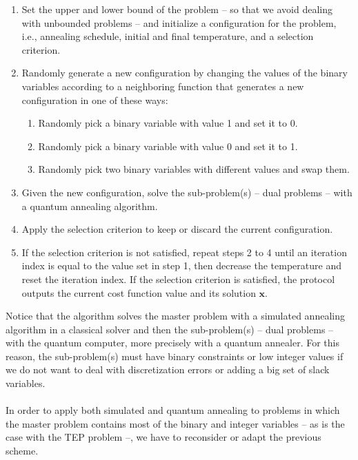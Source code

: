 \begin{enumerate}
    \item Set the upper and lower bound of the problem -- so that we avoid dealing with unbounded problems -- and initialize a configuration for the problem, i.e., annealing schedule, initial and final temperature, and a selection criterion.
    \item Randomly generate a new configuration by changing the values of the binary variables according to a neighboring function that generates a new configuration in one of these ways:
    \begin{enumerate}
        \item Randomly pick a binary variable with value 1 and set it to 0.
        \item Randomly pick a binary variable with value 0 and set it to 1.
        \item Randomly pick two binary variables with different values and swap them.
    \end{enumerate}
    \item Given the new configuration, solve the sub-problem(s) -- dual problems -- with a quantum annealing algorithm.
    \item Apply the selection criterion to keep or discard the current configuration.
    \item If the selection criterion is not satisfied, repeat steps 2 to 4 until an iteration index is equal to the value set in step 1, then decrease the temperature and reset the iteration index. If the selection criterion is satisfied, the protocol outputs the current cost function value and its solution $\mathbf{x}$.
\end{enumerate}
Notice that the algorithm solves the master problem with a simulated annealing algorithm in a classical solver and then the sub-problem(s) -- dual problems -- with the quantum computer, more precisely with a quantum annealer. For this reason, the sub-problem(s) must have binary constraints or low integer values if we do not want to deal with discretization errors or adding a big set of slack variables.\\\\
In order to apply both simulated and quantum annealing to problems in which the master problem contains most of the binary and integer variables -- as is the case with the TEP problem --, we have to reconsider or adapt the previous scheme.
